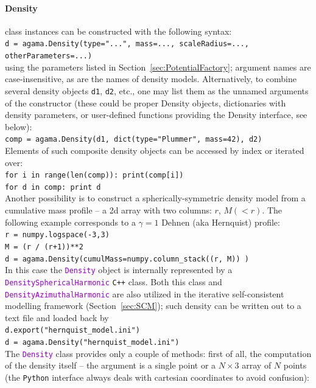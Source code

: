 \documentclass[12pt]{article}
\newcommand{\Cpp}  {\texttt{C++}\xspace}
\newcommand{\Python}{\texttt{Python}\xspace}
\newcommand{\ttt}[1]{\textcolor{darkviolet}{\texttt{#1}}}
\begin{document}
\paragraph{Density} class instances can be constructed with the following syntax: \\
\texttt{d = agama.Density(type="...", mass=..., scaleRadius=..., otherParameters=...)}\\
using the parameters listed in Section~\ref{sec:PotentialFactory}; argument names are case-insensitive, as are the names of density models. 
Alternatively, to combine several density objects \texttt{d1}, \texttt{d2}, etc., one may list them as the unnamed arguments of the constructor (these could be proper Density objects, dictionaries with density parameters, or user-defined functions providing the Density interface, see below):\\
\texttt{comp = agama.Density(d1, dict(type="Plummer", mass=42), d2)}\\[2mm]
Elements of such composite density objects can be accessed by index or iterated over:\\
\texttt{for i in range(len(comp)): print(comp[i])}\\
\texttt{for d in comp: print d}\\[2mm]
Another possibility is to construct a spherically-symmetric density model from a cumulative mass profile -- a 2d array with two columns: $r$, $M(<r)$. The following example corresponds to a $\gamma=1$ Dehnen (aka Hernquist) profile:\\
\texttt{r = numpy.logspace(-3,3)}\\
\texttt{M = (r / (r+1))**2}\\
\texttt{d = agama.Density(cumulMass=numpy.column_stack((r, M)) )}\\[2mm]
In this case the \ttt{Density} object is internally represented by a \ttt{DensitySphericalHarmonic} \Cpp class. Both this class and \ttt{DensityAzimuthalHarmonic} are also utilized in the iterative self-consistent modelling framework (Section~\ref{sec:SCM}); such density can be written out to a text file and loaded back by\\
\texttt{d.export("hernquist_model.ini")}\\
\texttt{d = agama.Density("hernquist_model.ini")}\\[2mm]
The \ttt{Density} class provides only a couple of methods: first of all, the computation of the density itself -- the argument is a single point or a $N\times3$ array of $N$ points (the \Python interface always deals with cartesian coordinates to avoid confusion):\\
\end{document}
